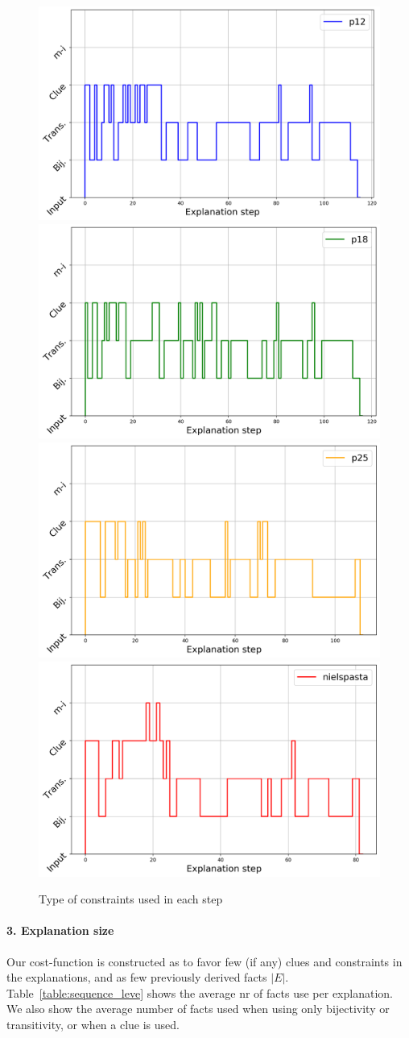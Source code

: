 \begin{figure}[t]
\centering
\includegraphics[width=0.49\linewidth]{figures/plot_cost_steps_p12}
\includegraphics[width=0.49\linewidth]{figures/plot_cost_steps_p18}
\includegraphics[width=0.49\linewidth]{figures/plot_cost_steps_p25}
\includegraphics[width=0.49\linewidth]{figures/plot_cost_steps_nielspasta}
\caption{Type of constraints used in each step}
\label{fig:steps}
\end{figure}

\paragraph{3. Explanation size}
Our cost-function is constructed as to favor few (if any) clues and constraints in the explanations, and as few previously derived facts $|E|$. Table~\ref{table:sequence_leve} shows the average nr of facts use per explanation. We also show the average number of facts used when using only bijectivity or transitivity, or when a clue is used.

